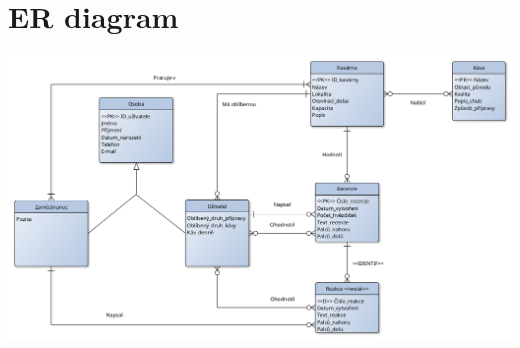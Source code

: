 \documentclass[a4paper, 11pt]{article}
\begin{document}
\newpage
\section{ER diagram}
\begin{center}
			\includegraphics[width=1\linewidth]{./IDS_ER.png} \\
            \label{ER}
\end{center}
\end{document}
